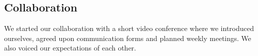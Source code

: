\subsection{Collaboration}
We started our collaboration with a short video conference where we introduced ourselves, agreed upon communication forms and planned weekly meetings. We also voiced our expectations of each other.



\newpage